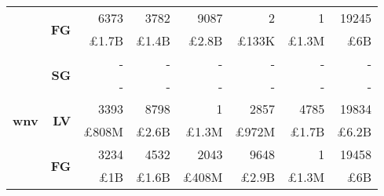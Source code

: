 \begin{table}[!htbp]
\begin{tabular}{r|r|r|r|r|r|r|r}
\cline{2-8}
& \multirow{2}{*}{\textbf{FG}}
& {6373} & {3782} & {9087} & {2} & {1} & {19245}\\
& {} & {\pounds1.7B} & {\pounds1.4B} & {\pounds2.8B} & {\pounds133K} & {\pounds1.3M} & {\pounds6B}\\
\hline
\multirow{6}{*}{\textbf{wnv}}
& \multirow{2}{*}{\textbf{SG}}
& {-} & {-} & {-} & {-} & {-} & {-}\\
& {} & {-} & {-} & {-} & {-} & {-} & {-}\\
\cline{2-8}
& \multirow{2}{*}{\textbf{LV}}
& {3393} & {8798} & {1} & {2857} & {4785} & {19834}\\
& {} & {\pounds808M} & {\pounds2.6B} & {\pounds1.3M} & {\pounds972M} & {\pounds1.7B} & {\pounds6.2B}\\
\cline{2-8}
& \multirow{2}{*}{\textbf{FG}}
& {3234} & {4532} & {2043} & {9648} & {1} & {19458}\\
& {} & {\pounds1B} & {\pounds1.6B} & {\pounds408M} & {\pounds2.9B} & {\pounds1.3M} & {\pounds6B}
\end{tabular}
\end{table}

